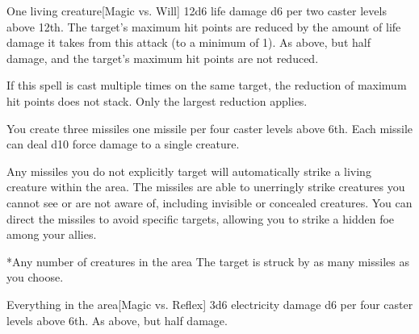 \spellrng{\rngmed}
\begin{spelltarget}{One living creature}[Magic vs. Will]
    \spellsuccess 12d6 life damage \add d6 per two caster levels above 12th. The target's maximum hit points are reduced by the amount of life damage it takes from this attack (to a minimum of 1).
    \spellfailure As above, but half damage, and the target's maximum hit points are not reduced.
\end{spelltarget}
\spellnotes If this spell is cast multiple times on the same target, the reduction of maximum hit points does not stack. Only the largest reduction applies.

\cursespellnotes

\spellline
\spellspecial You create three missiles \add one missile per four caster levels above 6th. Each missile can deal d10 force damage to a single creature.

Any missiles you do not explicitly target will automatically strike a living creature within the area. The missiles are able to unerringly strike creatures you cannot see or are not aware of, including invisible or concealed creatures. You can direct the missiles to avoid specific targets, allowing you to strike a hidden foe among your allies.
\begin{spelltargets}*{Any number of creatures in the area}
    \spelleffect The target is struck by as many missiles as you choose.
\end{spelltargets}

\begin{spelltarget}{Everything in the area}[Magic vs. Reflex]
    \spellsuccess 3d6 electricity damage \add d6 per four caster levels above 6th.
    \spellfailure As above, but half damage.
\end{spelltarget}
\spellnotes \destructivespellnotes

